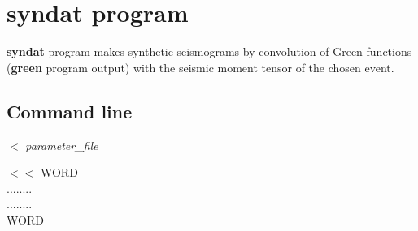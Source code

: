 \section{syndat program}

{\bf syndat} program makes synthetic seismograms by convolution
of Green functions ({\bf green} program output) with the
seismic moment tensor of the chosen event.

\subsection {Command line}
                                                                               

 $<$ {\it parameter\_file}

 $<<$ WORD \\
\noindent ........  \\
\noindent ........  \\
\noindent WORD

